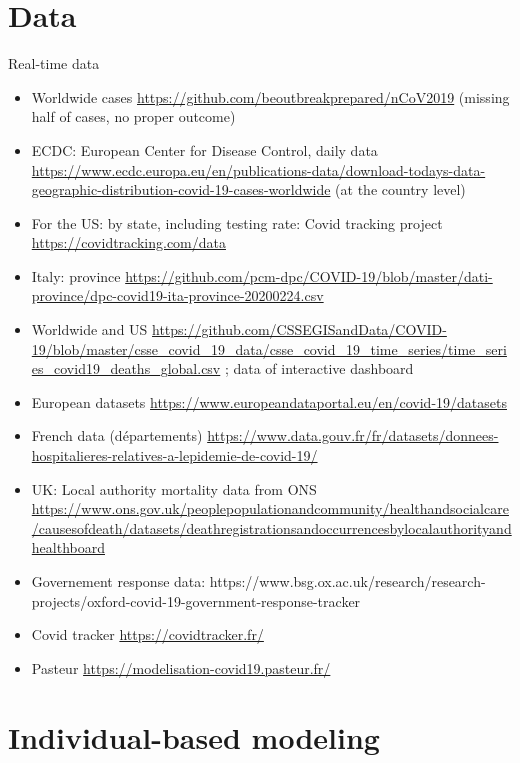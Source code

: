 \documentclass[10pt]{article}
\begin{document}
\section{Data}

Real-time data

\begin{itemize}
	\item Worldwide cases \cite{xu2020epidemiological} \url{https://github.com/beoutbreakprepared/nCoV2019} (missing half of cases, no proper outcome)
	\item ECDC: European Center for Disease Control, daily data \url{https://www.ecdc.europa.eu/en/publications-data/download-todays-data-geographic-distribution-covid-19-cases-worldwide} (at the country level)
	\item For the US: by state, including testing rate: Covid tracking project \url{https://covidtracking.com/data}
	\item Italy: province \url{https://github.com/pcm-dpc/COVID-19/blob/master/dati-province/dpc-covid19-ita-province-20200224.csv}
	\item Worldwide and US \url{https://github.com/CSSEGISandData/COVID-19/blob/master/csse\_covid\_19\_data/csse\_covid\_19\_time\_series/time\_series\_covid19\_deaths\_global.csv} ; data of interactive dashboard \cite{dong2020interactive}
	\item European datasets \url{https://www.europeandataportal.eu/en/covid-19/datasets}
	\item French data (d{\'e}partements) \url{https://www.data.gouv.fr/fr/datasets/donnees-hospitalieres-relatives-a-lepidemie-de-covid-19/}
	\item UK: Local authority mortality data from ONS \url{https://www.ons.gov.uk/peoplepopulationandcommunity/healthandsocialcare/causesofdeath/datasets/deathregistrationsandoccurrencesbylocalauthorityandhealthboard}
	\item Governement response data: https://www.bsg.ox.ac.uk/research/research-projects/oxford-covid-19-government-response-tracker
	\item Covid tracker \url{https://covidtracker.fr/}
	\item Pasteur \url{https://modelisation-covid19.pasteur.fr/}
\end{itemize}


	
	
\section{Individual-based modeling}
\end{document}
